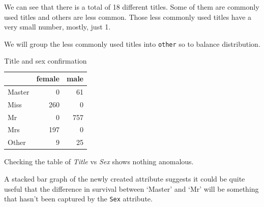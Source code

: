 \documentclass[
]{book}
\newenvironment{Shaded}{\begin{snugshade}}{\end{snugshade}}
\newcommand{\CommentTok}[1]{\textcolor[rgb]{0.56,0.35,0.01}{\textit{#1}}}
\newcommand{\DataTypeTok}[1]{\textcolor[rgb]{0.13,0.29,0.53}{#1}}
\newcommand{\DecValTok}[1]{\textcolor[rgb]{0.00,0.00,0.81}{#1}}
\newcommand{\KeywordTok}[1]{\textcolor[rgb]{0.13,0.29,0.53}{\textbf{#1}}}
\newcommand{\NormalTok}[1]{#1}
\newcommand{\OperatorTok}[1]{\textcolor[rgb]{0.81,0.36,0.00}{\textbf{#1}}}
\newcommand{\OtherTok}[1]{\textcolor[rgb]{0.56,0.35,0.01}{#1}}
\newcommand{\StringTok}[1]{\textcolor[rgb]{0.31,0.60,0.02}{#1}}
\begin{document}
We can see that there is a total of 18 different titles. Some of them are commonly used titles and others are less common. Those less commonly used titles have a very small number, mostly, just 1.

We will group the less commonly used titles into \texttt{other} so to balance distribution.

\begin{Shaded}
\end{Shaded}

\begin{table}

\caption{\label{tab:unnamed-chunk-6}Title and sex confirmation}
\centering
\begin{tabular}[t]{lrr}
\toprule
  & female & male\\
\midrule
Master & 0 & 61\\
Miss & 260 & 0\\
Mr & 0 & 757\\
Mrs & 197 & 0\\
Other & 9 & 25\\
\bottomrule
\end{tabular}
\end{table}

Checking the table of \emph{Title} vs \emph{Sex} shows nothing anomalous.

A stacked bar graph of the newly created attribute suggests it could be quite useful that the difference in survival between `Master' and `Mr' will be something that hasn't been captured by the \texttt{Sex} attribute.
\end{document}
